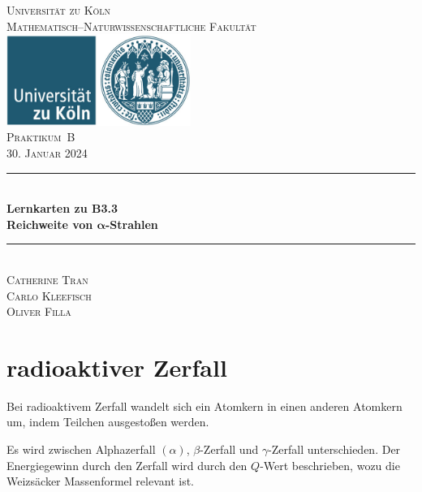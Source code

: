 \documentclass[12pt,a4paper]{scrartcl}
\numberwithin{equation}{section} %
\newcommand{\HRule}{\rule{\linewidth}{0.7mm}}
\renewcommand{\[}{} %
\renewcommand{\]}{\noindent} %
\begin{document}
\begin{titlepage}
	\pagestyle{empty}
	
	\begin{center}
		
		\textsc{\LARGE Universität zu Köln }\\ [0.4cm]
		\textsc{Mathematisch--Naturwissenschaftliche Fakultät} \\[1.5cm]
		
		\includegraphics[width=0.45\textwidth]{../media/uni.jpg}\\[1.5cm]  %
		
		\textsc{\Large Praktikum~B}\\[2mm]
		\textsc{30. Januar 2024}\\[10mm]
		\HRule \\[0.4cm]
		
		{	\Huge \bfseries Lernkarten zu B3.3}\\[0.4cm]
		{	\huge \bfseries Reichweite von $\pmb{\alpha}$-Strahlen}\\[0.3cm]
		
		\HRule \\[3cm]
		
		\textsc{\Large Catherine Tran } \\[3pt]
		\textsc{\Large Carlo Kleefisch } \\[3pt]
		\textsc{\Large Oliver Filla } \\[3pt]
	\end{center}
\end{titlepage}
\newpage
\tableofcontents
\newpage

\hypertarget{radioaktiver-zerfall}{%
\section{radioaktiver Zerfall}\label{radioaktiver-zerfall}}

Bei radioaktivem Zerfall wandelt sich ein Atomkern in einen anderen
Atomkern um, indem Teilchen ausgestoßen werden.

Es wird zwischen Alphazerfall $(\alpha)$, $\beta$-Zerfall und
$\gamma$-Zerfall unterschieden. Der Energiegewinn durch den Zerfall
wird durch den $Q$-Wert beschrieben, wozu die Weizsäcker Massenformel
relevant ist.
\end{document}
